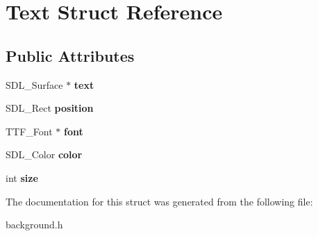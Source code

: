\hypertarget{structText}{}\section{Text Struct Reference}
\label{structText}
\subsection*{Public Attributes}
\begin{DoxyCompactItemize}
\item 
\mbox{\label{structText_aff9f844dbb049d64f616d143376b7d55}} 
S\+D\+L\+\_\+\+Surface $\ast$ {\bfseries text}
\item 
\mbox{\label{structText_a6bedd1f0e3a1422ae4533301a8fe0641}} 
S\+D\+L\+\_\+\+Rect {\bfseries position}
\item 
\mbox{\label{structText_ae23ac53acb57e760b91c81d8c4aec8c7}} 
T\+T\+F\+\_\+\+Font $\ast$ {\bfseries font}
\item 
\mbox{\label{structText_ab0f771bd18d8e968f7aaee4a4e26e385}} 
S\+D\+L\+\_\+\+Color {\bfseries color}
\item 
\mbox{\label{structText_aeeefa18b9d848a532e402065815d21b7}} 
int {\bfseries size}
\end{DoxyCompactItemize}


The documentation for this struct was generated from the following file\+:\begin{DoxyCompactItemize}
\item 
background.\+h\end{DoxyCompactItemize}
